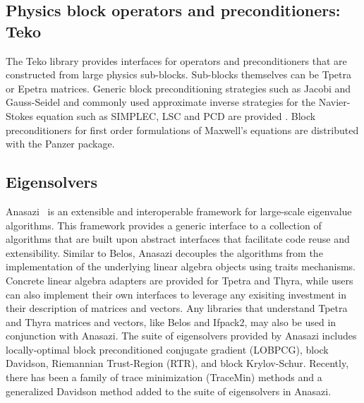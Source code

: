 \subsection{Physics block operators and preconditioners: Teko}
\label{sec:teko}

The Teko library provides interfaces for operators and preconditioners that are constructed from large physics sub-blocks.
Sub-blocks themselves can be Tpetra or Epetra matrices.
Generic block preconditioning strategies such as Jacobi and Gauss-Seidel and commonly used approximate inverse strategies for the Navier-Stokes equation such as SIMPLEC, LSC and PCD are provided \cite{CyrShadidEtAl2012_StabilizationScalableBlockPreconditioning}.
Block preconditioners for first order formulations of Maxwell's equations are distributed with the Panzer package.




\subsection{Eigensolvers}
Anasazi~\cite{Baker2009a} is an extensible and interoperable framework for large-scale eigenvalue algorithms.
This framework provides a generic interface to a collection of algorithms that are built upon abstract interfaces
that facilitate code reuse and extensibility.  Similar to Belos, Anasazi decouples the algorithms from the 
implementation of the underlying linear algebra objects using traits mechanisms.  Concrete linear algebra adapters
are provided for Tpetra and Thyra, while users can also implement their own interfaces to leverage any exisiting
investment in their description of matrices and vectors.  Any libraries that understand Tpetra and Thyra matrices
and vectors, like Belos and Ifpack2, may also be used in conjunction with Anasazi.  The suite of eigensolvers provided
by Anasazi includes locally-optimal block preconditioned conjugate gradient (LOBPCG), block Davidson, Riemannian Trust-Region
(RTR), and block Krylov-Schur.  Recently, there has been a family of trace minimization (TraceMin) methods and a
generalized Davidson method added to the suite of eigensolvers in Anasazi. 

